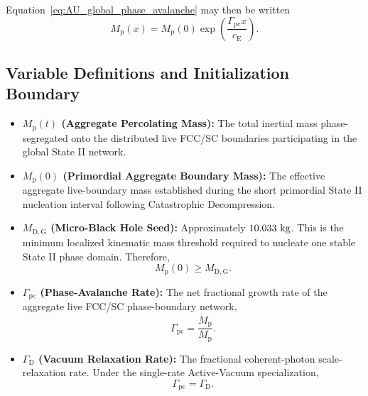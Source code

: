 Equation~\eqref{eq:AU_global_phase_avalanche} may then be written
\begin{equation}
    M_{\mathrm p}(x)
    =
    M_{\mathrm p}(0)
    \exp
    \left(
        \frac{
            \Gamma_{\mathrm{pc}}x
        }{
            c_{\mathrm E}
        }
    \right).
    \label{eq:AU_phase_avalanche_length}
\end{equation}


\subsection{Variable Definitions and Initialization Boundary}

\begin{itemize}

    \item \textbf{\(M_{\mathrm p}(t)\) (Aggregate Percolating Mass):}
    The total inertial mass phase-segregated onto the distributed live FCC/SC
    boundaries participating in the global State II network.

    \item \textbf{\(M_{\mathrm p}(0)\) (Primordial Aggregate Boundary Mass):}
    The effective aggregate live-boundary mass established during the short
    primordial State II nucleation interval following Catastrophic
    Decompression.

    \item \textbf{\(M_{\mathrm{D,G}}\) (Micro-Black Hole Seed):}
    Approximately \(10.033~{\rm kg}\). This is the minimum localized
    kinematic mass threshold required to nucleate one stable State II phase
    domain. Therefore,
    \begin{equation}
        M_{\mathrm p}(0)
        \geq
        M_{\mathrm{D,G}}.
    \end{equation}

    \item \textbf{\(\Gamma_{\mathrm{pc}}\) (Phase-Avalanche Rate):}
    The net fractional growth rate of the aggregate live FCC/SC
    phase-boundary network,
    \begin{equation}
        \Gamma_{\mathrm{pc}}
        =
        \frac{
            \dot M_{\mathrm p}
        }{
            M_{\mathrm p}
        }.
    \end{equation}

    \item \textbf{\(\Gamma_{\mathrm D}\) (Vacuum Relaxation Rate):}
    The fractional coherent-photon scale-relaxation rate. Under the
    single-rate Active-Vacuum specialization,
    \begin{equation}
        \Gamma_{\mathrm{pc}}
        =
        \Gamma_{\mathrm D}.
    \end{equation}

\end{itemize}

